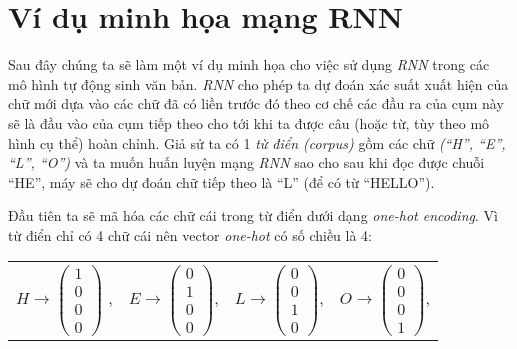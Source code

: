 
\def\a#1{$a^{<#1>}$}
\def\y#1{$\widehat{y}^{<#1>}$}
\def\x#1{$x^{<#1>}$}
\def\wax{$W_{ax}$} 
\def\waa{$W_{aa}$} 
\def\wya{$W_{ya}$} 
\def\ba{$b_{a}$}
\def\by{$b_{y}$}

\section{Ví dụ minh họa mạng RNN}
Sau đây chúng ta sẽ làm một ví dụ minh họa cho việc sử dụng \textit{RNN} trong các mô hình tự động sinh văn bản. \textit{RNN} cho phép ta dự đoán xác suất xuất hiện của chữ mới dựa vào các chữ đã có liền trước đó theo cơ chế các đầu ra của cụm này sẽ là đầu vào của cụm tiếp theo cho tới khi ta được câu (hoặc từ, tùy theo mô hình cụ thể) hoàn chỉnh. Giả sử ta có 1 \textit{từ điển (corpus)} gồm các chữ\textit{ (``H'', ``E'', ``L'', ``O'')} và ta muốn huấn luyện mạng \textit{RNN} sao cho sau khi đọc được chuỗi ``HE'', máy sẽ cho dự đoán chữ tiếp theo là ``L'' (để có từ ``HELLO'').

Đầu tiên ta sẽ mã hóa các chữ cái trong từ điển dưới dạng \textit{one-hot encoding}. Vì từ điển chỉ có 4 chữ cái nên vector \textit{one-hot} có số chiều là 4:
\begin{center}
\begin{tabular}{ c c c c}
   $H \longrightarrow \begin{pmatrix} 1 \\ 0 \\ 0 \\ 0 \end{pmatrix} $ ,
   &
   $E \longrightarrow \begin{pmatrix} 0 \\ 1 \\ 0 \\ 0 \end{pmatrix} $,
   &
   $L \longrightarrow \begin{pmatrix} 0 \\ 0 \\ 1 \\ 0 \end{pmatrix} $,
   &
   $O \longrightarrow \begin{pmatrix} 0 \\ 0 \\ 0 \\ 1 \end{pmatrix} $,
\end{tabular}
\end{center}

